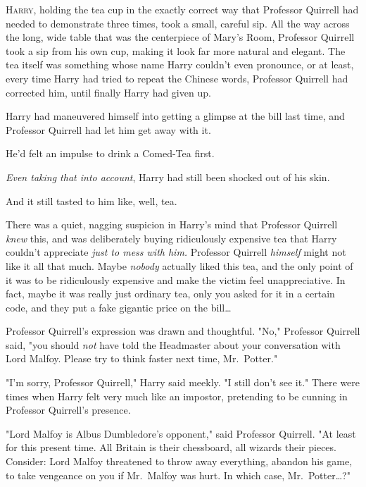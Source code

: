 
\lettrine{H}{arry}, holding
the tea cup in the exactly correct way that Professor Quirrell had needed to
demonstrate three times, took a small, careful sip. All the way across the
long, wide table that was the centerpiece of Mary's Room, Professor Quirrell
took a sip from his own cup, making it look far more natural and elegant. The
tea itself was something whose name Harry couldn't even pronounce, or at least,
every time Harry had tried to repeat the Chinese words, Professor Quirrell had
corrected him, until finally Harry had given up.

Harry had maneuvered himself into getting a glimpse at the bill last time, and
Professor Quirrell had let him get away with it.

He'd felt an impulse to drink a Comed-Tea first.

\emph{Even taking that into account}, Harry had still been shocked out of his
skin.

And it still tasted to him like, well, tea.

There was a quiet, nagging suspicion in Harry's mind that Professor Quirrell
\emph{knew} this, and was deliberately buying ridiculously expensive tea that
Harry couldn't appreciate \emph{just to mess with him.} Professor Quirrell
\emph{himself} might not like it all that much. Maybe \emph{nobody} actually
liked this tea, and the only point of it was to be ridiculously expensive and
make the victim feel unappreciative. In fact, maybe it was really just ordinary
tea, only you asked for it in a certain code, and they put a fake gigantic
price on the bill{\ldots}

Professor Quirrell's expression was drawn and thoughtful. "No," Professor
Quirrell said, "you should \emph{not} have told the Headmaster about your
conversation with Lord Malfoy. Please try to think faster next time,
Mr.~Potter."

"I'm sorry, Professor Quirrell," Harry said meekly. "I still don't see it."
There were times when Harry felt very much like an impostor, pretending to be
cunning in Professor Quirrell's presence.

"Lord Malfoy is Albus Dumbledore's opponent," said Professor Quirrell. "At
least for this present time. All Britain is their chessboard, all wizards their
pieces. Consider: Lord Malfoy threatened to throw away everything, abandon his
game, to take vengeance on you if Mr.~Malfoy was hurt. In which case,
Mr.~Potter{\ldots}?"

